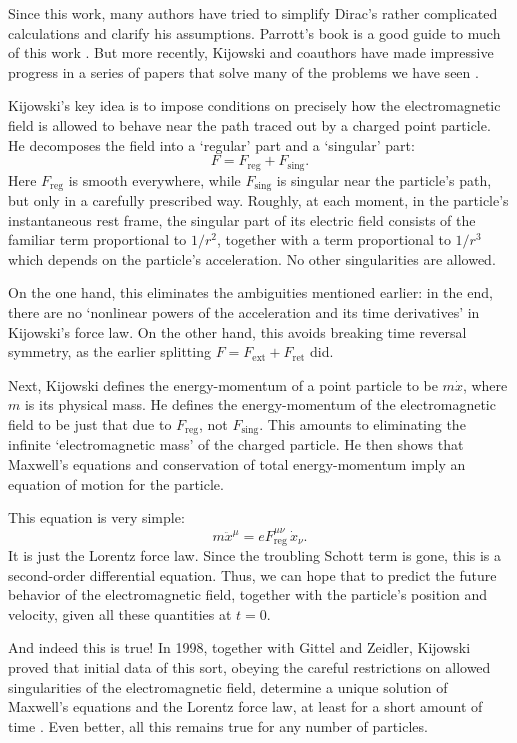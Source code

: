 \documentclass{article}
\newcommand{\ret}{\mathrm{ret}}
\newcommand{\ext}{\mathrm{ext}}
\newcommand{\sing}{\mathrm{sing}}
\newcommand{\reg}{\mathrm{reg}}
\begin{document}
Since this work, many authors have tried to simplify Dirac's rather complicated calculations 
and clarify his assumptions.  Parrott's book is a good guide to much of this work 
\cite{Parrott}.  But more recently, Kijowski and coauthors have made impressive progress in a series of papers that solve many of the problems we have seen \cite{GKZ1998,Kijowski1994a,Kijowski1994b,KP2003,KP2007}.

Kijowski's key idea is to impose conditions on precisely how the electromagnetic
field is allowed to behave near the path traced out by a charged point particle.  He decomposes the field into a `regular' part and a `singular' part:
\[            F = F_\reg + F_\sing . \]
Here $F_\reg$ is smooth everywhere, while $F_\sing$ is singular near the particle's
path, but only in a carefully prescribed way.   Roughly, at each moment, in the particle's instantaneous rest frame, the singular part of its electric field consists of the familiar
term proportional to $1/r^2$, together with a term proportional to $1/r^3$ which depends on the particle's acceleration.  No other singularities are allowed. 

On the one hand, this eliminates the ambiguities mentioned earlier: in the end, there are no `nonlinear powers of the acceleration and its time derivatives' in Kijowski's force law.  On the other hand, this avoids breaking time reversal symmetry, as the earlier splitting $F = F_\ext + F_\ret$ did.  

Next, Kijowski defines the energy-momentum of a point particle to be $m \dot{x}$,
where $m$ is its physical mass.   He defines the energy-momentum of the electromagnetic field to be just that due to $F_\reg$, not $F_\sing$.   This amounts to eliminating the infinite `electromagnetic mass' of the charged particle. He then shows that Maxwell's equations and conservation of total energy-momentum imply an equation of motion for the particle.

This equation is very simple:
\[    m \ddot{x}^\mu = e F_{\reg}^{\mu \nu} \,\dot{x}_\nu  . \]
It is just the Lorentz force law.    Since the troubling Schott term is gone,
this is a second-order differential equation.  Thus, we can hope that to predict the future behavior of the electromagnetic field, together with the particle's position and velocity, given all these quantities at $t = 0$.  

And indeed this is true!  In 1998, together with Gittel and Zeidler, Kijowski proved that initial data of this sort, obeying the careful restrictions on allowed singularities of the electromagnetic field, determine a unique solution of Maxwell's equations and the Lorentz force law, at least for a short amount of time \cite{GKZ1998}.   Even better, all this remains true for any number of particles.
\end{document}
